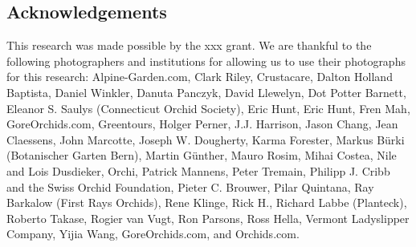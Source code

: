 \documentclass[twocolumn]{bmcart}
\begin{document}
\begin{backmatter}

\section*{Acknowledgements}
\label{sec:acknowledgements}


This research was made possible by the xxx grant. We are thankful to the following photographers and institutions for allowing us to use their photographs for this research: Alpine-Garden.com, Clark Riley, Crustacare, Dalton Holland Baptista, Daniel Winkler, Danuta Panczyk, David Llewelyn, Dot Potter Barnett, Eleanor S. Saulys (Connecticut Orchid Society), Eric Hunt, Eric Hunt, Fren Mah, GoreOrchids.com, Greentours, Holger Perner, J.J. Harrison, Jason Chang, Jean Claessens, John Marcotte, Joseph W. Dougherty, Karma Forester, Markus Bürki (Botanischer Garten Bern), Martin Günther, Mauro Rosim, Mihai Costea, Nile and Lois Dusdieker, Orchi, Patrick Mannens, Peter Tremain, Philipp J. Cribb and the Swiss Orchid Foundation, Pieter C. Brouwer, Pilar Quintana, Ray Barkalow (First Rays Orchids), Rene Klinge, Rick H., Richard Labbe (Planteck), Roberto Takase, Rogier van Vugt, Ron Parsons, Ross Hella, Vermont Ladyslipper Company, Yijia Wang, GoreOrchids.com, and Orchids.com.


%



\end{backmatter}
\end{document}

